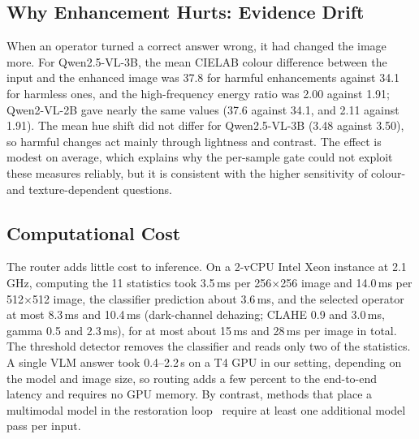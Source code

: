 \documentclass[lettersize,journal]{IEEEtran}
\begin{document}
\subsection{Why Enhancement Hurts: Evidence Drift}

When an operator turned a correct answer wrong, it had changed the image more. For Qwen2.5-VL-3B, the mean CIELAB colour difference between the input and the enhanced image was 37.8 for harmful enhancements against 34.1 for harmless ones, and the high-frequency energy ratio was 2.00 against 1.91; Qwen2-VL-2B gave nearly the same values (37.6 against 34.1, and 2.11 against 1.91). The mean hue shift did not differ for Qwen2.5-VL-3B (3.48 against 3.50), so harmful changes act mainly through lightness and contrast. The effect is modest on average, which explains why the per-sample gate could not exploit these measures reliably, but it is consistent with the higher sensitivity of colour- and texture-dependent questions.

\subsection{Computational Cost}

The router adds little cost to inference. On a 2-vCPU Intel Xeon instance at 2.1\,GHz, computing the 11 statistics took 3.5\,ms per 256$\times$256 image and 14.0\,ms per 512$\times$512 image, the classifier prediction about 3.6\,ms, and the selected operator at most 8.3\,ms and 10.4\,ms (dark-channel dehazing; CLAHE 0.9 and 3.0\,ms, gamma 0.5 and 2.3\,ms), for at most about 15\,ms and 28\,ms per image in total. The threshold detector removes the classifier and reads only two of the statistics. A single VLM answer took 0.4--2.2\,s on a T4 GPU in our setting, depending on the model and image size, so routing adds a few percent to the end-to-end latency and requires no GPU memory. By contrast, methods that place a multimodal model in the restoration loop~\cite{cai2025degradationaware, huang2026docintent, zeng2026fixbeforesearch} require at least one additional model pass per input.
\end{document}
